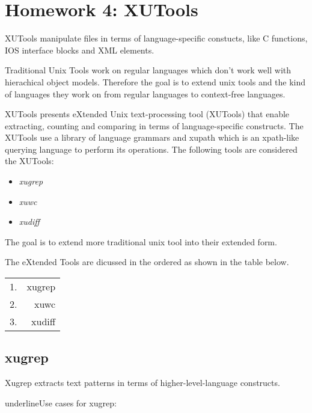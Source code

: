 
\section[Homework 4]{Homework 4: XUTools}

XUTools manipulate files in terms of language-specific constucts, like C functions, IOS interface blocks and XML elements.

Traditional Unix Tools work on regular languages which don't work well with hierachical object models. Therefore the goal is to extend unix tools and the kind of languages they work on from regular languages to context-free languages.

XUTools presents eXtended Unix text-processing tool (XUTools) that enable extracting, counting and comparing in terms of language-specific constructs. The XUTools use a library of language grammars and xupath which is an xpath-like querying language to perform its operations. The following tools are considered the XUTools:

\begin{itemize}
	\item \textit{xugrep}
	\item \textit{xuwc}
	\item \textit{xudiff}
\end{itemize}

The goal is to extend more traditional unix tool into their extended form.

The eXtended Tools are dicussed in the ordered as shown in the table below.

\begin{tabular}{ l | r }
1.&xugrep\\
2.&xuwc\\
3.&xudiff\\
\end{tabular}

\subsection{xugrep}

Xugrep extracts text patterns in terms of higher-level-language constructs.

underline{Use cases for xugrep:} \\

